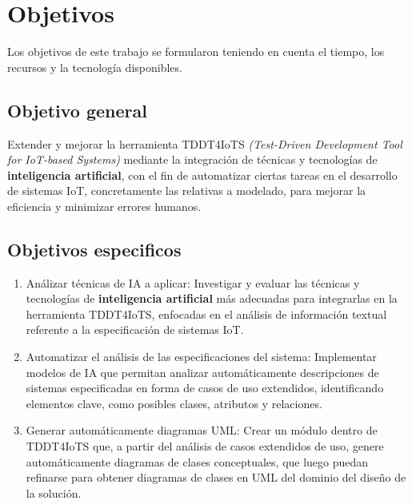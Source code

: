 \section{Objetivos}\label{section:objetivos}

Los objetivos de este trabajo se formularon teniendo en cuenta el tiempo, los recursos y la tecnología disponibles.

\subsection{Objetivo general}

Extender y mejorar la herramienta TDDT4IoTS \textit{(Test-Driven Development Tool for IoT-based Systems)} mediante la integración de técnicas y tecnologías de \textbf{inteligencia artificial}, con el fin de automatizar ciertas tareas en el desarrollo de sistemas IoT, concretamente las relativas a modelado, para mejorar la eficiencia y minimizar errores humanos.

\subsection{Objetivos especificos}

\begin{enumerate}
	\item Análizar técnicas de IA a aplicar: Investigar y evaluar las técnicas y tecnologías de \textbf{inteligencia artificial} más adecuadas para integrarlas en la herramienta TDDT4IoTS, enfocadas en el análisis de información textual referente a la especificación de sistemas IoT.
	
	\item Automatizar el análisis de las especificaciones del sistema: Implementar modelos de IA que permitan analizar automáticamente descripciones de sistemas especificadas en forma de casos de uso extendidos, identificando elementos clave, como posibles clases, atributos y relaciones.
	
	\item Generar automáticamente diagramas UML: Crear un módulo dentro de TDDT4IoTS que, a partir del análisis de casos extendidos de uso, genere automáticamente diagramas de clases conceptuales, que luego puedan refinarse para obtener diagramas de clases en UML del dominio del diseño de la solución.

\end{enumerate}